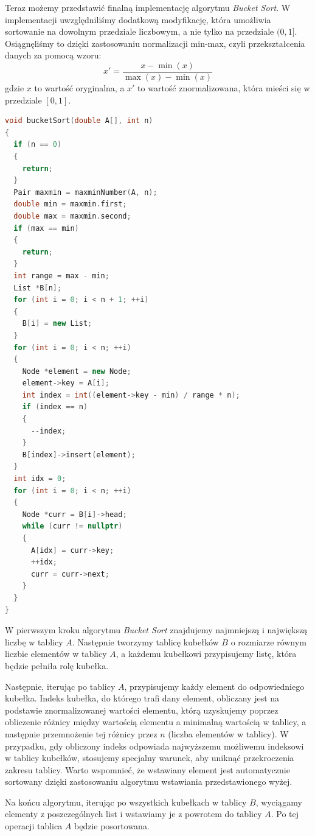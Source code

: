 \documentclass{article}
\begin{document}
Teraz możemy przedstawić finalną implementację algorytmu \textit{Bucket Sort}. W implementacji uwzględniliśmy dodatkową modyfikację, która umożliwia sortowanie na dowolnym przedziale liczbowym, a nie tylko na przedziale $(0, 1]$. Osiągnęliśmy to dzięki zastosowaniu normalizacji min-max, czyli przekształcenia danych za pomocą wzoru:
\[
    x' = \frac{x - \min(x)}{\max(x) - \min(x)}
\]
gdzie $x$ to wartość oryginalna, a $x'$ to wartość znormalizowana, która mieści się w przedziale $[0, 1]$.
\newpage
\begin{lstlisting}[style=mystyle, language=C++, caption={Implementacja \texttt{Bucket Sort}}, label={lst:bucketsort}]
void bucketSort(double A[], int n)
{
  if (n == 0)
  {
    return;
  }
  Pair maxmin = maxminNumber(A, n);
  double min = maxmin.first;
  double max = maxmin.second;
  if (max == min)
  {
    return;
  }
  int range = max - min;
  List *B[n];
  for (int i = 0; i < n + 1; ++i)
  {
    B[i] = new List;
  }
  for (int i = 0; i < n; ++i)
  {
    Node *element = new Node;
    element->key = A[i];
    int index = int((element->key - min) / range * n);
    if (index == n)
    {
      --index;
    }
    B[index]->insert(element);
  }
  int idx = 0;
  for (int i = 0; i < n; ++i)
  {
    Node *curr = B[i]->head;
    while (curr != nullptr)
    {
      A[idx] = curr->key;
      ++idx;
      curr = curr->next;
    }
  }
}
\end{lstlisting}

W pierwszym kroku algorytmu \textit{Bucket Sort} znajdujemy najmniejszą i największą liczbę w tablicy $A$. Następnie tworzymy tablicę kubełków $B$ o rozmiarze równym liczbie elementów w tablicy $A$, a każdemu kubełkowi przypisujemy listę, która będzie pełniła rolę kubełka.

Następnie, iterując po tablicy $A$, przypisujemy każdy element do odpowiedniego kubełka. Indeks kubełka, do którego trafi dany element, obliczany jest na podstawie znormalizowanej wartości elementu, którą uzyskujemy poprzez obliczenie różnicy między wartością elementu a minimalną wartością w tablicy, a następnie przemnożenie tej różnicy przez $n$ (liczba elementów w tablicy). W przypadku, gdy obliczony indeks odpowiada najwyższemu możliwemu indeksowi w tablicy kubełków, stosujemy specjalny warunek, aby uniknąć przekroczenia zakresu tablicy. Warto wspomnieć, że wstawiany element jest automatycznie sortowany dzięki zastosowaniu algorytmu wstawiania przedstawionego wyżej.

Na końcu algorytmu, iterując po wszystkich kubełkach w tablicy $B$, wyciągamy elementy z poszczególnych list i wstawiamy je z powrotem do tablicy $A$. Po tej operacji tablica $A$ będzie posortowana.
\end{document}
